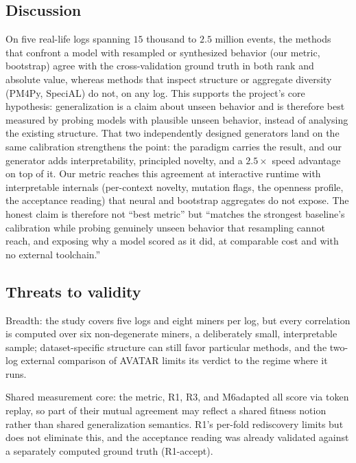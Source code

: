 \documentclass[runningheads]{llncs}
\newcommand{\chg}[1]{\textcolor{chgblue}{#1}}
\begin{document}
\subsection{Discussion}
\label{sec:eval:discussion}
\chg{On five real-life logs spanning $15$ thousand to $2.5$ million events,} the methods that confront a model with resampled or synthesized behavior (our metric, bootstrap) agree with the cross-validation ground truth in both rank and absolute value, whereas methods that inspect structure or aggregate diversity (PM4Py, SpeciAL) do not\chg{, on any log}. This supports the project's core hypothesis: generalization is a claim about unseen behavior and is therefore best measured by probing models with plausible unseen behavior, instead of analysing the existing structure. \chg{That two independently designed generators land on the same calibration strengthens the point: the paradigm carries the result, and our generator adds interpretability, principled novelty, and a $2.5\times$ speed advantage on top of it.} Our metric reaches this agreement at interactive runtime with interpretable internals (per-context novelty, mutation flags, the openness profile, the acceptance reading) that neural and bootstrap aggregates do not expose. The honest claim is therefore not ``best metric'' but ``matches the strongest baseline's calibration while probing genuinely unseen behavior that resampling cannot reach, and exposing why a model scored as it did, at comparable cost and with no external toolchain.''

\subsection{Threats to validity}
\label{sec:eval:threats}
\chg{Breadth: the study covers five logs and eight miners per log, but every correlation is computed over six non-degenerate miners, a deliberately small, interpretable sample; dataset-specific structure can still favor particular methods, and the two-log external comparison of AVATAR limits its verdict to the regime where it runs.}

Shared measurement core: the metric, R1, R3, and M6adapted all score via token replay, so part of their mutual agreement may reflect a shared fitness notion rather than shared generalization semantics. R1's per-fold rediscovery limits but does not eliminate this, and the acceptance reading was already validated against a separately computed ground truth (R1-accept).
\end{document}
